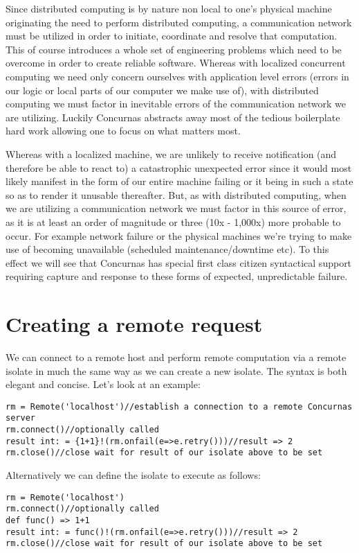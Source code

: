 \documentclass[conc-doc]{subfiles}
\begin{document}
Since distributed computing is by nature non local to one's physical machine originating the need to perform distributed computing, a communication network must be utilized in order to initiate, coordinate and resolve that computation. This of course introduces a whole set of engineering problems which need to be overcome in order to create reliable software. Whereas with localized concurrent computing we need only concern ourselves with application level errors (errors in our logic or local parts of our computer we make use of), with distributed computing we must factor in inevitable errors of the communication network we are utilizing. Luckily Concurnas abstracts away most of the tedious boilerplate hard work allowing one to focus on what matters most.

Whereas with a localized machine, we are unlikely to receive notification (and therefore be able to react to) a catastrophic unexpected error since it would most likely manifest in the form of our entire machine failing or it being in such a state so as to render it unusable thereafter. But, as with distributed computing, when we are utilizing a communication network we must factor in this source of error, as it is at least an order of magnitude or three (10x - 1,000x) more probable to occur. For example network failure or the physical machines we’re trying to make use of becoming unavailable (scheduled maintenance/downtime etc). To this effect we will see that Concurnas has special first class citizen syntactical support requiring capture and response to these forms of expected, unpredictable failure.

\section{Creating a remote request}	
We can connect to a remote host and perform remote computation via a remote isolate in much the same way as we can create a new isolate. The syntax is both elegant and concise. Let's look at an example:
\begin{lstlisting}
rm = Remote('localhost')//establish a connection to a remote Concurnas server
rm.connect()//optionally called
result int: = {1+1}!(rm.onfail(e=>e.retry()))//result => 2
rm.close()//close wait for result of our isolate above to be set
\end{lstlisting}

Alternatively we can define the isolate to execute as follows:

\begin{lstlisting}
rm = Remote('localhost')
rm.connect()//optionally called
def func() => 1+1
result int: = func()!(rm.onfail(e=>e.retry()))//result => 2
rm.close()//close wait for result of our isolate above to be set
\end{lstlisting}
\end{document}
